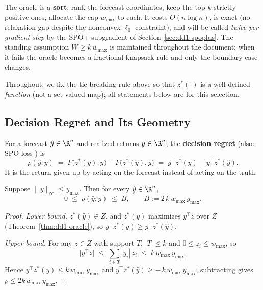 \begin{keypoint}
The oracle is a \textbf{sort}: rank the forecast coordinates, keep the top $k$
strictly positive ones, allocate the cap $w_{\max}$ to each. It costs
$O(n \log n)$, is exact (no relaxation gap despite the nonconvex $\ell_0$
constraint), and will be called \emph{twice per gradient step} by the SPO+
subgradient of Section~\ref{sec:dd1-spoplus}. The standing assumption
$W \ge k\, w_{\max}$ is maintained throughout the document; when it fails the
oracle becomes a fractional-knapsack rule and only the boundary case changes.
\end{keypoint}

Throughout, we fix the tie-breaking rule above so that $z^*(\cdot)$ is a
well-defined \emph{function} (not a set-valued map); all statements below are
for this selection.

\subsection{Decision Regret and Its Geometry}
\label{sec:dd1-regret}

\begin{definition}
\label{def:dd1-regret}
For a forecast $\hat{y} \in \R^n$ and realized returns $y \in \R^n$, the
\textbf{decision regret} (also: SPO loss \cite{elmachtoub2022smart}) is
\begin{equation}
\label{eq:dd1-regret}
\rho(\hat{y}; y) \;=\; F\bigl(z^*(y), y\bigr) - F\bigl(z^*(\hat{y}), y\bigr)
\;=\; y^\top z^*(y) - y^\top z^*(\hat{y}).
\end{equation}
It is the return given up by acting on the forecast instead of acting on the
truth.
\end{definition}

\begin{proposition}
\label{prop:dd1-regret-range}
Suppose $\|y\|_\infty \le y_{\max}$. Then for every $\hat{y} \in \R^n$,
\begin{equation}
\label{eq:dd1-B}
0 \;\le\; \rho(\hat{y}; y) \;\le\; B, \qquad B := 2\, k\, w_{\max}\, y_{\max}.
\end{equation}
\end{proposition}

\begin{proof}
\emph{Lower bound.} $z^*(\hat{y}) \in Z$, and $z^*(y)$ maximizes $y^\top z$
over $Z$ (Theorem~\ref{thm:dd1-oracle}), so
$y^\top z^*(y) \ge y^\top z^*(\hat{y})$.

\emph{Upper bound.} For any $z \in Z$ with support $T$, $|T| \le k$ and
$0 \le z_i \le w_{\max}$, so
\[
\bigl| y^\top z \bigr| \;\le\; \sum_{i \in T} |y_i|\, z_i
\;\le\; k\, w_{\max}\, y_{\max}.
\]
Hence $y^\top z^*(y) \le k\, w_{\max}\, y_{\max}$ and
$y^\top z^*(\hat{y}) \ge -\,k\, w_{\max}\, y_{\max}$; subtracting gives
$\rho \le 2 k\, w_{\max}\, y_{\max}$.
\end{proof}


